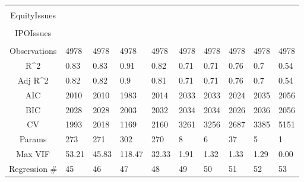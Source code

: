 \documentclass{article}
\begin{document}
\begin{table}[H]
\begin{tabular}{|clllllllll|}
   &  &  &  &  &  &  &  &  &  \\ 
  EquityIssues &  &  &  &  &  &  &  &  &  \\ 
   &  &  &  &  &  &  &  &  &  \\ 
  IPOIssues &  &  &  &  &  &  &  &  &  \\ 
   &  &  &  &  &  &  &  &  &  \\ 
  \hline 
 Observations & 4978 & 4978 & 4978 & 4978 & 4978 & 4978 & 4978 & 4978 & 4978 \\ 
  R^2 & 0.83 & 0.83 & 0.91 & 0.82 & 0.71 & 0.71 & 0.76 & 0.7 & 0.54 \\ 
  Adj R^2 & 0.82 & 0.82 & 0.9 & 0.81 & 0.71 & 0.71 & 0.76 & 0.7 & 0.54 \\ 
  AIC & 2010 & 2010 & 1983 & 2014 & 2033 & 2033 & 2024 & 2035 & 2056 \\ 
  BIC & 2028 & 2028 & 2003 & 2032 & 2034 & 2034 & 2026 & 2036 & 2056 \\ 
  CV & 1993 & 2018 & 1169 & 2160 & 3261 & 3256 & 2687 & 3385 & 5151 \\ 
  Params & 273 & 271 & 302 & 270 & 8 & 6 & 37 & 5 & 1 \\ 
  Max VIF & 53.21 & 45.83 & 118.47 & 32.33 & 1.91 & 1.32 & 1.33 & 1.29 & 0.00 \\ 
  Regression \# & 45 & 46 & 47 & 48 & 49 & 50 & 51 & 52 & 53 \\ 
   \hline
\end{tabular}
 
\end{table}
\end{document}
